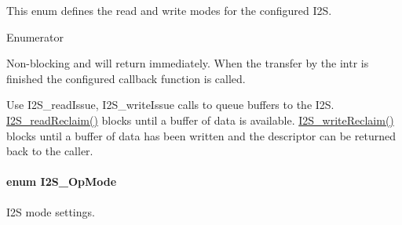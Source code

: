 This enum defines the read and write modes for the configured I2\+S. \begin{Desc}
\item[Enumerator]\par
\begin{description}
\item[{\em 
I2\+S\+\_\+\+M\+O\+D\+E\+\_\+\+C\+A\+L\+L\+B\+A\+C\+K\label{_i2_s_8h_a120b8555bc048186bbd436dbdbb5b405a2c7b409c7185250bef51c0e6de600d08}
}]Non-\/blocking and will return immediately. When the transfer by the intr is finished the configured callback function is called. \item[{\em 
I2\+S\+\_\+\+M\+O\+D\+E\+\_\+\+I\+S\+S\+U\+E\+R\+E\+C\+L\+A\+I\+M\label{_i2_s_8h_a120b8555bc048186bbd436dbdbb5b405a294b93c8f4917e45ac62b7c12b017f85}
}]Use I2\+S\+\_\+read\+Issue, I2\+S\+\_\+write\+Issue calls to queue buffers to the I2\+S. \hyperlink{_i2_s_8h_a5678bf72e1d1954179d2a0db5c45eca8}{I2\+S\+\_\+read\+Reclaim()} blocks until a buffer of data is available. \hyperlink{_i2_s_8h_aa04de09198983b7bc17a000fc003ab1a}{I2\+S\+\_\+write\+Reclaim()} blocks until a buffer of data has been written and the descriptor can be returned back to the caller. \end{description}
\end{Desc}
\paragraph[{I2\+S\+\_\+\+Op\+Mode}]{\setlength{\rightskip}{0pt plus 5cm}enum {\bf I2\+S\+\_\+\+Op\+Mode}}\label{_i2_s_8h_a1eb065ff9040979c9d6586c8d0df9ee0}


I2\+S mode settings. 

